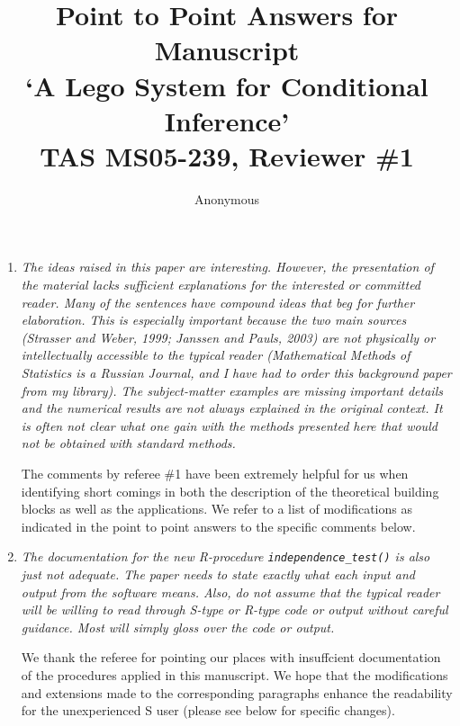 \documentclass[11pt]{article}
\begin{document}
\title{Point to Point Answers for Manuscript \\
`A Lego System for Conditional Inference' \\
TAS MS05-239, Reviewer \#1}
\author{Anonymous}
\maketitle

\begin{enumerate}
\item \textsl{The ideas raised in this paper are interesting. However, the presentation of the 
              material lacks sufficient explanations for the interested or committed reader. 
              Many of the sentences have compound ideas that beg for further elaboration. 
              This is especially important because the two main sources (Strasser and Weber, 1999; 
              Janssen and Pauls, 2003) are not physically or intellectually accessible to the 
              typical reader (Mathematical Methods of Statistics is a Russian Journal, and I have 
              had to order this background paper from my library). The subject-matter examples are 
              missing important details and the numerical results are not always explained in the 
              original context. It is often not clear what one gain with the methods presented here 
              that would not be obtained with standard methods.}

The comments by referee \#1 have been extremely helpful for us when
identifying short comings in both the description of the theoretical
building blocks as well as the applications. We refer to a list of modifications
as indicated in the point to point answers to the specific comments below.

\item \textsl{The documentation for the new R-procedure \texttt{independence\_test()} is also just not 
              adequate. The paper needs to state exactly what each input and output from the 
              software means. Also, do not assume that the typical reader will be willing to 
              read through S-type or R-type code or output without careful guidance. Most will 
              simply gloss over the code or output.}

We thank the referee for pointing our places with insuffcient documentation
of the procedures applied in this manuscript. We hope that the modifications
and extensions made to the corresponding paragraphs enhance the readability
for the unexperienced \textsf{S} user (please see below for specific
changes).


\end{enumerate}
\end{document}

